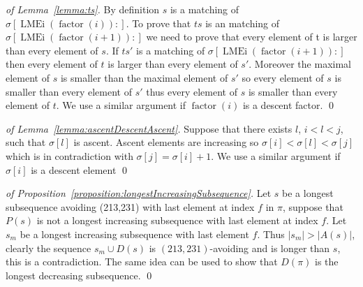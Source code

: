 \documentclass[a4paper]{llncs}
\newcommand{\ppattern}{\sigma}
\DeclareMathOperator{\LMEi}{LMEi}
\DeclareMathOperator{\factor}{factor}
\DeclareMathOperator{\firsta}{first}
\newcommand{\first}[2]{\firsta(\factor{#1}{#2})}
\begin{document}
%

\bigskip

\begin{proof}[of Lemma~\ref{lemma:ts}]
By definition $s$ is a matching of $\ppattern[\LMEi(\factor(i)):]$. To prove that $ts$ is an matching of $\ppattern[\LMEi(\factor(i+1)):]$ we need to prove that every element of t is larger than every element of $s$. If $ts'$ is a matching of $\ppattern[\LMEi(\factor(i+1)):]$ then every element of $t$ is larger than every element of $s'$. Moreover the maximal element of $s$ is smaller than  the maximal element of $s'$ so every element of $s$ is smaller than every element of $s'$ thus every element of $s$ is smaller than every element of $t$. We use a similar argument if $\factor(i)$ is a descent factor.
\qed
\end{proof}

\bigskip

\begin{proof}[of Lemma~\ref{lemma:ascentDescentAscent}]
Suppose that there exists $l$, $i<l<j$,
such that $\ppattern[l]$ is ascent. Ascent elements are increasing  so $\sigma[i]<\sigma[l]<\sigma[j]$ which is in contradiction with $\sigma[j]=\sigma[i]+1$.
We use a similar argument if $\sigma[i]$ is a descent element
\qed
\end{proof}

\bigskip

\begin{proof}[of Proposition~\ref{proposition:longestIncreasingSubsequence}]
Let $s$ be a longest subsequence avoiding (213,231) with last element at index $f$ in $\pi$,
suppose that $P(s)$ is not a longest increasing subsequence with last element at index $f$. Let $s_m$ be a longest increasing subsequence with last element $f$.
Thus $|s_m|>|A(s)|$, clearly the sequence $s_m \cup D(s)$
is $(213,231)$-avoiding and is longer than $s$, this is a contradiction.
The same idea can be used to show that $D(\pi)$ is the longest decreasing subsequence.
\qed
\end{proof}
\end{document}
